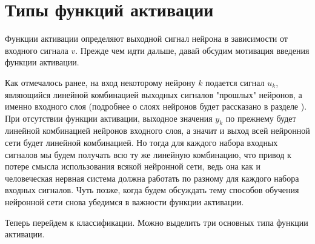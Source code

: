 \documentclass[a4paper,12pt]{report}
\begin{document}
\section{Типы функций активации}
Функции активации определяют выходной сигнал нейрона в зависимости от
входного сигнала $v$. Прежде чем идти дальше, давай обсудим мотивация
введения функции активации.

Как отмечалось ранее, на вход некоторому нейрону $k$ подается сигнал
$u_k$, являющийся линейной комбинацией выходных сигналов "прошлых"
нейронов, а именно входного слоя
(подробнее о слоях нейронов будет рассказано в разделе
). При отсутствии функции
активации, выходное значения $y_k$ по прежнему будет линейной
комбинацией нейронов входного слоя, а значит и выход всей нейронной
сети будет линейной комбинацией. Но тогда для каждого набора входных
сигналов мы будем получать всю ту же линейную комбинацию, что привод к
потере смысла использования всякой нейронной сети, ведь она как и
человеческая нервная система должна работать по разному для каждого
набора входных сигналов. Чуть позже, когда будем
обсуждать тему способов обучения нейронной сети снова убедимся в
важности функции активации.

Теперь перейдем к классификации. Можно выделить три основных типа функции
активации.
\end{document}
